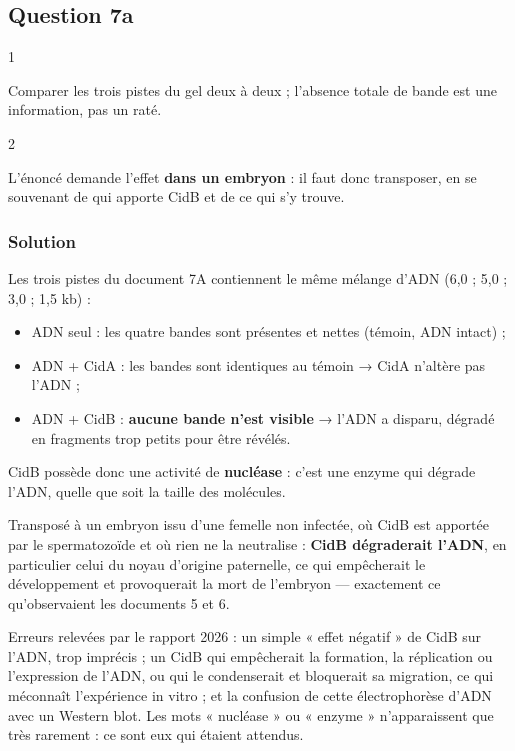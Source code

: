 \documentclass[11pt,a4paper]{article}
\providecommand{\tightlist}{\setlength{\itemsep}{0pt}\setlength{\parskip}{0pt}}
\begin{document}
\hypertarget{question-7a}{%
\subsection{Question 7a}\label{question-7a}}

\begin{indication}{1}

Comparer les trois pistes du gel deux à deux ; l'absence totale de bande est une information, pas un raté.

\end{indication}

\begin{indication}{2}

L'énoncé demande l'effet \textbf{dans un embryon} : il faut donc transposer, en se souvenant de qui apporte CidB et de ce qui s'y trouve.

\end{indication}

\hypertarget{solution-54}{%
\subsubsection{Solution}\label{solution-54}}

Les trois pistes du document 7A contiennent le même mélange d'ADN (6,0 ; 5,0 ; 3,0 ; 1,5 kb) :

\begin{itemize}
\tightlist
\item
  ADN seul : les quatre bandes sont présentes et nettes (témoin, ADN intact) ;
\item
  ADN + CidA : les bandes sont identiques au témoin → CidA n'altère pas l'ADN ;
\item
  ADN + CidB : \textbf{aucune bande n'est visible} → l'ADN a disparu, dégradé en fragments trop petits pour être révélés.
\end{itemize}

CidB possède donc une activité de \textbf{nucléase} : c'est une enzyme qui dégrade l'ADN, quelle que soit la taille des molécules.

Transposé à un embryon issu d'une femelle non infectée, où CidB est apportée par le spermatozoïde et où rien ne la neutralise : \textbf{CidB dégraderait l'ADN}, en particulier celui du noyau d'origine paternelle, ce qui empêcherait le développement et provoquerait la mort de l'embryon --- exactement ce qu'observaient les documents 5 et 6.

\begin{piege}

Erreurs relevées par le rapport 2026 : un simple « effet négatif » de CidB sur l'ADN, trop imprécis ; un CidB qui empêcherait la formation, la réplication ou l'expression de l'ADN, ou qui le condenserait et bloquerait sa migration, ce qui méconnaît l'expérience in vitro ; et la confusion de cette électrophorèse d'ADN avec un Western blot. Les mots « nucléase » ou « enzyme » n'apparaissent que très rarement : ce sont eux qui étaient attendus.

\end{piege}
\end{document}
